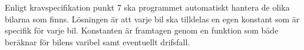 Enligt kravspecifikation punkt 7 ska programmet automatiskt hantera de olika bilarna som finns. Lösningen är att varje bil ska tilldelas en egen konstant som är specifik för varje bil. Konstanten är framtagen genom en funktion som både beräknar för bilens varibel samt eventuellt drifsfall. 
